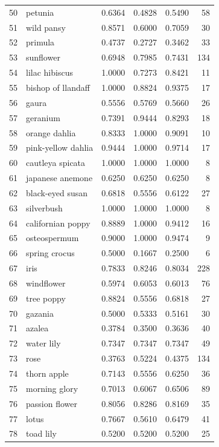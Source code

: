 \begin{longtable}{rlrrrr}
50 & petunia & 0.6364 & 0.4828 & 0.5490 & 58 \\
51 & wild pansy & 0.8571 & 0.6000 & 0.7059 & 30 \\
52 & primula & 0.4737 & 0.2727 & 0.3462 & 33 \\
53 & sunflower & 0.6948 & 0.7985 & 0.7431 & 134 \\
54 & lilac hibiscus & 1.0000 & 0.7273 & 0.8421 & 11 \\
55 & bishop of llandaff & 1.0000 & 0.8824 & 0.9375 & 17 \\
56 & gaura & 0.5556 & 0.5769 & 0.5660 & 26 \\
57 & geranium & 0.7391 & 0.9444 & 0.8293 & 18 \\
58 & orange dahlia & 0.8333 & 1.0000 & 0.9091 & 10 \\
59 & pink-yellow dahlia & 0.9444 & 1.0000 & 0.9714 & 17 \\
60 & cautleya spicata & 1.0000 & 1.0000 & 1.0000 & 8 \\
61 & japanese anemone & 0.6250 & 0.6250 & 0.6250 & 8 \\
62 & black-eyed susan & 0.6818 & 0.5556 & 0.6122 & 27 \\
63 & silverbush & 1.0000 & 1.0000 & 1.0000 & 8 \\
64 & californian poppy & 0.8889 & 1.0000 & 0.9412 & 16 \\
65 & osteospermum & 0.9000 & 1.0000 & 0.9474 & 9 \\
66 & spring crocus & 0.5000 & 0.1667 & 0.2500 & 6 \\
67 & iris & 0.7833 & 0.8246 & 0.8034 & 228 \\
68 & windflower & 0.5974 & 0.6053 & 0.6013 & 76 \\
69 & tree poppy & 0.8824 & 0.5556 & 0.6818 & 27 \\
70 & gazania & 0.5000 & 0.5333 & 0.5161 & 30 \\
71 & azalea & 0.3784 & 0.3500 & 0.3636 & 40 \\
72 & water lily & 0.7347 & 0.7347 & 0.7347 & 49 \\
73 & rose & 0.3763 & 0.5224 & 0.4375 & 134 \\
74 & thorn apple & 0.7143 & 0.5556 & 0.6250 & 36 \\
75 & morning glory & 0.7013 & 0.6067 & 0.6506 & 89 \\
76 & passion flower & 0.8056 & 0.8286 & 0.8169 & 35 \\
77 & lotus & 0.7667 & 0.5610 & 0.6479 & 41 \\
78 & toad lily & 0.5200 & 0.5200 & 0.5200 & 25 \\

\end{longtable}
